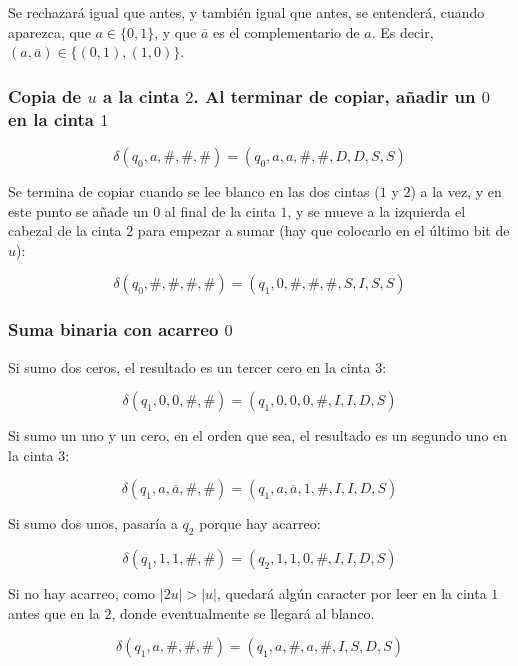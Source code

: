 \documentclass[12pt]{article}
\begin{document}
\begin{ejercicio}
        Se rechazará igual que antes, y también igual que antes, se entenderá, cuando aparezca, que $a \in \{0,1\}$,
        y que $\overline{a}$ es el complementario de $a$. Es decir, $(a, \overline{a}) \in \{(0,1), (1,0)\}$.

        \subsubsection*{Copia de $u$ a la cinta $2$. Al terminar de copiar, añadir un $0$ en la cinta $1$}
        
        $$\delta(q_0, a, \#, \#, \#) = (q_0, a, a, \#, \#, D, D, S, S)$$

        Se termina de copiar cuando se lee blanco en las dos cintas ($1$ y $2$) a la vez, y en este punto se añade un $0$ al final de la cinta $1$,
        y se mueve a la izquierda el cabezal de la cinta $2$ para empezar a sumar (hay que colocarlo en el último bit de $u$): 

        $$\delta(q_0, \#, \#, \#, \#) = (q_1, 0, \#, \#, \#, S, I, S, S)$$

        \subsubsection*{Suma binaria con acarreo $0$}

        Si sumo dos ceros, el resultado es un tercer cero en la cinta $3$:

        $$\delta(q_1, 0, 0, \#, \#) = (q_1, 0, 0, 0, \#, I, I, D, S)$$

        Si sumo un uno y un cero, en el orden que sea, el resultado es 
        un segundo uno en la cinta $3$:

        $$\delta(q_1, a, \overline{a}, \#, \#) = (q_1, a, \overline{a}, 1, \#, I, I, D, S)$$

        Si sumo dos unos, pasaría a $q_2$ porque hay acarreo:

        \begin{equation}\label{eq:transicionacar}
            \delta(q_1, 1, 1, \#, \#) = (q_2, 1, 1, 0, \#, I, I, D, S)
        \end{equation}

        Si no hay acarreo, como $|2u| > |u|$, quedará algún caracter por 
        leer en la cinta $1$ antes que en la $2$, donde eventualmente se 
        llegará al blanco. 
        
        $$\delta(q_1, a, \#, \#, \#) = (q_1, a, \#, a, \#, I, S, D, S)$$


\end{ejercicio}
\end{document}
